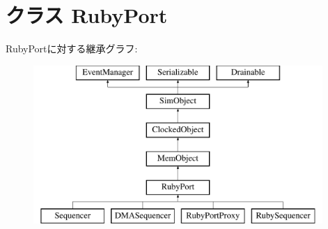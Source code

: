 \hypertarget{classSequencer_1_1RubyPort}{
\section{クラス RubyPort}
\label{classSequencer_1_1RubyPort}
}
RubyPortに対する継承グラフ:\begin{figure}[H]
\begin{center}
\leavevmode
\includegraphics[height=6cm]{classSequencer_1_1RubyPort}
\end{center}
\end{figure}
